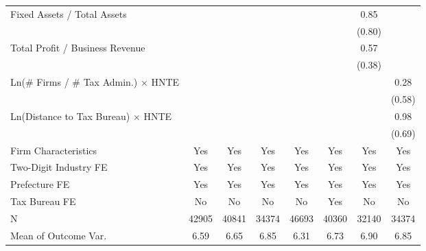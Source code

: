 \begin{tabular}{lccccccc}
\addlinespace
Fixed Assets / Total Assets&               &               &               &               &               &        0.85   &               \\
                    &               &               &               &               &               &      (0.80)   &               \\
\addlinespace
Total Profit / Business Revenue&               &               &               &               &               &        0.57   &               \\
                    &               &               &               &               &               &      (0.38)   &               \\
\addlinespace
Ln(\# Firms / \# Tax Admin.) $\times$ HNTE&               &               &               &               &               &               &        0.28   \\
                    &               &               &               &               &               &               &      (0.58)   \\
\addlinespace
Ln(Distance to Tax Bureau) $\times$ HNTE&               &               &               &               &               &               &        0.98   \\
                    &               &               &               &               &               &               &      (0.69)   \\
\addlinespace
\midrule
Firm Characteristics&         Yes   &         Yes   &         Yes   &         Yes   &         Yes   &         Yes   &         Yes   \\
Two-Digit Industry FE&         Yes   &         Yes   &         Yes   &         Yes   &         Yes   &         Yes   &         Yes   \\
Prefecture FE       &         Yes   &         Yes   &         Yes   &         Yes   &         Yes   &         Yes   &         Yes   \\
Tax Bureau FE       &          No   &          No   &          No   &          No   &         Yes   &          No   &          No   \\
N                   &       42905   &       40841   &       34374   &       46693   &       40360   &       32140   &       34374   \\
Mean of Outcome Var.          &        6.59   &        6.65   &        6.85   &        6.31   &        6.73   &        6.90   &        6.85   \\
\bottomrule
\end{tabular}
